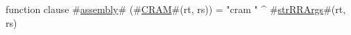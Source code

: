 function clause #\hyperref[sailMIPSzassembly]{assembly}# (#\hyperref[sailMIPSzCRAM]{CRAM}#(rt, rs)) = "cram " ^ #\hyperref[sailMIPSzstrRRArgs]{strRRArgs}#(rt, rs)
